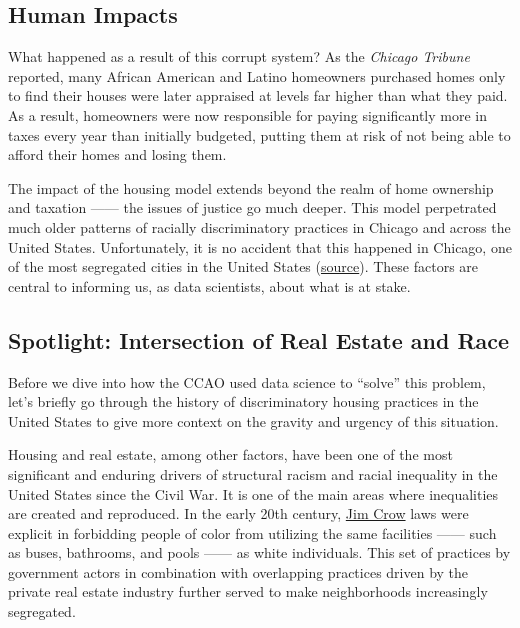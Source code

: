 \documentclass[
  letterpaper,
  DIV=11,
  numbers=noendperiod]{scrreprt}
\begin{document}
\subsection{Human Impacts}\label{human-impacts}

What happened as a result of this corrupt system? As the \emph{Chicago
Tribune} reported, many African American and Latino homeowners purchased
homes only to find their houses were later appraised at levels far
higher than what they paid. As a result, homeowners were now responsible
for paying significantly more in taxes every year than initially
budgeted, putting them at risk of not being able to afford their homes
and losing them.

The impact of the housing model extends beyond the realm of home
ownership and taxation ------ the issues of justice go much deeper. This
model perpetrated much older patterns of racially discriminatory
practices in Chicago and across the United States. Unfortunately, it is
no accident that this happened in Chicago, one of the most segregated
cities in the United States
(\href{https://fivethirtyeight.com/features/the-most-diverse-cities-are-often-the-most-segregated/}{source}).
These factors are central to informing us, as data scientists, about
what is at stake.

\subsection{Spotlight: Intersection of Real Estate and
Race}\label{spotlight-intersection-of-real-estate-and-race}

Before we dive into how the CCAO used data science to ``solve'' this
problem, let's briefly go through the history of discriminatory housing
practices in the United States to give more context on the gravity and
urgency of this situation.

Housing and real estate, among other factors, have been one of the most
significant and enduring drivers of structural racism and racial
inequality in the United States since the Civil War. It is one of the
main areas where inequalities are created and reproduced. In the early
20th century,
\href{https://www.history.com/topics/early-20th-century-us/jim-crow-laws}{Jim
Crow} laws were explicit in forbidding people of color from utilizing
the same facilities ------ such as buses, bathrooms, and pools ------ as
white individuals. This set of practices by government actors in
combination with overlapping practices driven by the private real estate
industry further served to make neighborhoods increasingly segregated.
\end{document}
